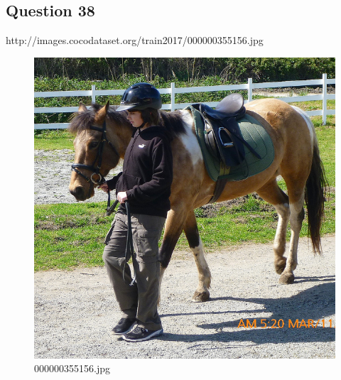     \subsection*{Question 38}
    http://images.cocodataset.org/train2017/000000355156.jpg
    \begin{figure}[h]
        \centering
        \includegraphics[width=0.8\linewidth]{../image set/easy/000000355156.jpg}
        \caption{000000355156.jpg}
    \end{figure}
